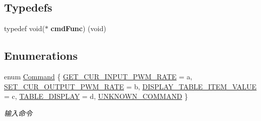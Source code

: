 \subsection*{Typedefs}
\begin{DoxyCompactItemize}
\item 
\mbox{\label{group___debug_port_ga7f03a47f9f4d1eb8db5ef233302a9cd8}} 
typedef void($\ast$ {\bfseries cmd\+Func}) (void)
\end{DoxyCompactItemize}
\subsection*{Enumerations}
\begin{DoxyCompactItemize}
\item 
enum \hyperlink{group___debug_port_ga2afce0a47a93eee73a314d53e4890153}{Command} \{ \newline
\hyperlink{group___debug_port_gga2afce0a47a93eee73a314d53e4890153ac288c8dd78228e1f345e690a725505fb}{G\+E\+T\+\_\+\+C\+U\+R\+\_\+\+I\+N\+P\+U\+T\+\_\+\+P\+W\+M\+\_\+\+R\+A\+TE} = \textquotesingle{}a\textquotesingle{}, 
\hyperlink{group___debug_port_gga2afce0a47a93eee73a314d53e4890153a90e7399e0580085ee0677cac9cf3a180}{S\+E\+T\+\_\+\+C\+U\+R\+\_\+\+O\+U\+T\+P\+U\+T\+\_\+\+P\+W\+M\+\_\+\+R\+A\+TE} = \textquotesingle{}b\textquotesingle{}, 
\hyperlink{group___debug_port_gga2afce0a47a93eee73a314d53e4890153a79bba8ed9780c39e1e5f6ff8baaeb269}{D\+I\+S\+P\+L\+A\+Y\+\_\+\+T\+A\+B\+L\+E\+\_\+\+I\+T\+E\+M\+\_\+\+V\+A\+L\+UE} = \textquotesingle{}c\textquotesingle{}, 
\hyperlink{group___debug_port_gga2afce0a47a93eee73a314d53e4890153a4f9beafec3b4a02ec855bde54050ad27}{T\+A\+B\+L\+E\+\_\+\+D\+I\+S\+P\+L\+AY} = \textquotesingle{}d\textquotesingle{}, 
\newline
\hyperlink{group___debug_port_gga2afce0a47a93eee73a314d53e4890153afd783e97d92382805c87eac47b6f208a}{U\+N\+K\+N\+O\+W\+N\+\_\+\+C\+O\+M\+M\+A\+ND}
 \}\begin{DoxyCompactList}\small\item\em 输入命令 \end{DoxyCompactList}
\end{DoxyCompactItemize}
